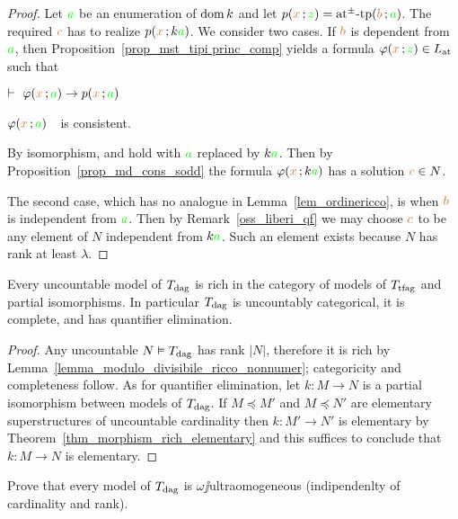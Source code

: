 \documentclass[creche.tex]{subfiles}
\begin{document}
\begin{proof}
Let ${\gr a}$ be an enumeration of $\dom k$ and let $p({\mr x}\,;{\gr z})=\atpmtp({\mr b}\,;{\gr a})$.  The required ${\mr c}$ has to realize $p({\mr x}\,;k{\gr a})$. We consider two cases. If ${\mr b}$ is dependent from ${\gr a}$, then Proposition~\ref{prop_mst_tipi princ_comp} yields a formula $\phi({\mr x}\,;{\gr z})\in\atL$ such that 

\noindent{}\hspace{5ex} $\proves\ \phi({\mr x}\,;{\gr a})\imp p({\mr x}\,;{\gr a})$

\noindent{}\hspace{5ex} $\phi({\mr x}\,;{\gr a})$\ \ is consistent.

By isomorphism,   and  hold with ${\gr a}$ replaced by $k{\gr a}$. Then by Proposition~\ref{prop_md_cons_sodd} the formula $\phi({\mr x}\,;k{\gr a})$ has a solution ${\mr c} \in N$.

The second case, which has no analogue in Lemma~\ref{lem_ordinericco}, is when ${\mr b}$ is independent from ${\gr a}$. Then by   Remark~\ref{oss_liberi_qf} we may choose ${\mr c}$ to be any element of $N$ independent from $k{\gr a}$. Such an element exists because $N$ has rank at least $\lambda$. 
\end{proof}

\begin{corollary}\label{corol_ModDivUltraOmog}
Every uncountable model of $T_{\rm dag}$ is rich in the category of models of $T_{\rm tfag}$ and partial isomorphisms. In particular $T_{\rm dag}$ is uncountably categorical, it is complete, and has quantifier elimination.
\end{corollary}
\begin{proof}
Any uncountable $N\models T_{\rm dag}$ has rank $|N|$, therefore it is rich by Lemma~\ref{lemma_modulo_divisibile_ricco_nonnumer}; categoricity and completeness follow. As for quantifier elimination, let $k:M\to N$ is a partial isomorphism between models of $T_{\rm dag}$. If $M\preceq M'$ and $M\preceq N'$ are elementary superstructures of uncountable cardinality then $k:M'\to N'$ is elementary by Theorem~\ref{thm_morphism_rich_elementary} and this suffices to conclude that  $k:M\to N$ is elementary. 
\end{proof}

\begin{exercise}
Prove that every model of $T_{\rm dag}$ is $\omega\jj$ultraomogeneous (indipendenlty of cardinality and rank).\QED
\end{exercise}
\end{document}
